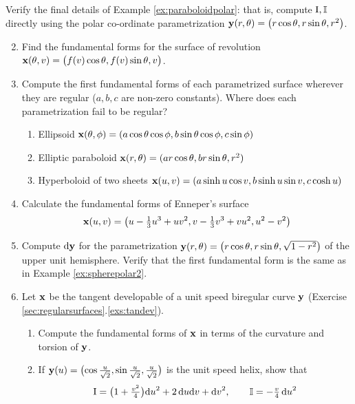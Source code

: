 \begin{exercises}
	\exstart Verify the final details of Example \ref{ex:paraboloidpolar}: that is, compute $\mathrm{I},\mathbb{I}$ directly using the polar co-ordinate parametrization ${\mathbf{y}}(r,\theta)=\bigl(r\cos\theta,r\sin\theta,r^2\big)$.
	
	\begin{enumerate}\setcounter{enumi}{1}  
	  \item\label{exs:revfund} Find the fundamental forms for the surface of revolution ${\mathbf{x}}(\theta,v)=\bigl(f(v)\cos\theta,f(v)\sin\theta,v\bigr)$.
	  
	
		\item Compute the first fundamental forms of each parametrized surface wherever they are regular ($a,b,c$ are non-zero constants). Where does each parametrization fail to be regular?\vspace{-2pt}
	  \begin{enumerate}
	    \item Ellipsoid ${\mathbf{x}}(\theta,\phi)=(a\cos\theta\cos\phi,b\sin\theta\cos\phi,c\sin\phi)$
	    \item Elliptic paraboloid ${\mathbf{x}}(r,\theta)=(ar\cos\theta,br\sin\theta,r^2)$
	    \item Hyperboloid of two sheets ${\mathbf{x}}(u,v)=(a\sinh u\cos v,b\sinh u\sin v,c\cosh u)$
	  \end{enumerate}
	  
	  
		\item\label{exs:enneper} Calculate the fundamental forms of Enneper's surface
		\[
			{\mathbf{x}}(u,v)=\bigl(u-\tfrac 13u^3+uv^2,v-\tfrac 13v^3+vu^2,u^2-v^2\bigr)
		\]
		
		
		\item Compute $\mathrm{d}{\mathbf{y}}$ for the parametrization ${\mathbf{y}}(r,\theta)=\bigl(r\cos\theta,r\sin\theta,\sqrt{1-r^2}\bigr)$ of the upper unit hemisphere. Verify that the first fundamental form is the same as in Example \ref{ex:spherepolar2}.
		
	  
	  \item\label{exs:tandevhelix} Let ${\mathbf{x}}$ be the tangent developable of a unit speed biregular curve ${\mathbf{y}}$ (Exercise \ref*{sec:regularsurfaces}.\ref{exs:tandev}).
	  \begin{enumerate}
	    \item Compute the fundamental forms of ${\mathbf{x}}$ in terms of the curvature and torsion of ${\mathbf{y}}$.
	    \item If ${\mathbf{y}}(u)=\bigl(\cos \frac u{\sqrt 2},\sin\frac u{\sqrt 2},\frac u{\sqrt 2}\bigr)$ is the unit speed helix, show that
	  	\[
	  		\mathrm{I}=\bigl(1+\tfrac{v^2}{4}\bigr){\mathrm{d} u}^2+2\,{\mathrm{d} u}{\mathrm{d} v}+{\mathrm{d} v}^2,\qquad \mathbb{I}=-\tfrac{v}{4}\,{\mathrm{d} u}^2
	  	\]
	 	\end{enumerate}
	 

\end{enumerate}
\end{exercises}
